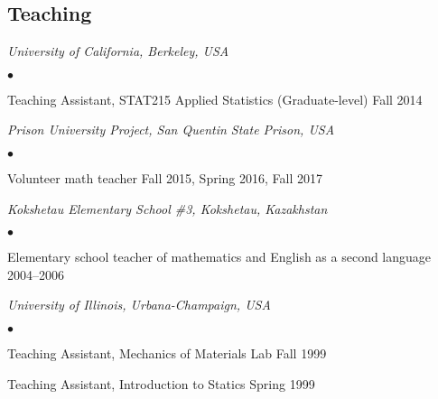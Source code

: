 \documentclass[margin,line]{res}
\newenvironment{list2}{
  \begin{list}{$\bullet$}{%
      \setlength{\itemsep}{0in}
      \setlength{\parsep}{0in} \setlength{\parskip}{0in}
      \setlength{\topsep}{0in} \setlength{\partopsep}{0in}
      \setlength{\leftmargin}{0.2in}}}{\end{list}}
\begin{document}
\begin{resume}
\section{\sc Teaching}

\emph{University of California, Berkeley, USA}
\begin{list2}
\item Teaching Assistant, STAT215 Applied Statistics
(Graduate-level) \hfill Fall 2014
\end{list2}

\emph{Prison University Project, San Quentin State Prison, USA}
\begin{list2}
\item Volunteer math teacher
\hfill Fall 2015, Spring 2016, Fall 2017
\end{list2}

\emph{Kokshetau Elementary School \#3, Kokshetau, Kazakhstan}
\begin{list2}
\item Elementary school teacher of mathematics and English as a second language
\hfill 2004--2006
\end{list2}

\emph{University of Illinois, Urbana-Champaign, USA}
\begin{list2}
\item Teaching Assistant, Mechanics of Materials Lab \hfill Fall 1999
\item Teaching Assistant, Introduction to Statics \hfill Spring 1999
\end{list2}

\end{resume}
\end{document}
